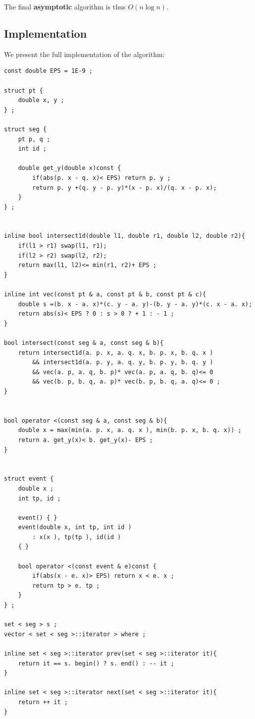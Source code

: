 The final \textbf{asymptotic} algorithm is thus $O (n \log n)$.

\subsection{ Implementation }

We present the full implementation of the algorithm:

\begin{verbatim}
const double EPS = 1E-9 ;
 
struct pt {
    double x, y ;
} ;
 
struct seg {
    pt p, q ;
    int id ;
 
    double get_y(double x)const {
        if(abs(p. x - q. x)< EPS) return p. y ;
        return p. y +(q. y - p. y)*(x - p. x)/(q. x - p. x);
    }
} ;
 
 
inline bool intersect1d(double l1, double r1, double l2, double r2){
    if(l1 > r1) swap(l1, r1);
    if(l2 > r2) swap(l2, r2);
    return max(l1, l2)<= min(r1, r2)+ EPS ;
}
 
inline int vec(const pt & a, const pt & b, const pt & c){
    double s =(b. x - a. x)*(c. y - a. y)-(b. y - a. y)*(c. x - a. x);
    return abs(s)< EPS ? 0 : s > 0 ? + 1 : - 1 ;
}
 
bool intersect(const seg & a, const seg & b){
    return intersect1d(a. p. x, a. q. x, b. p. x, b. q. x )
        && intersect1d(a. p. y, a. q. y, b. p. y, b. q. y )
        && vec(a. p, a. q, b. p)* vec(a. p, a. q, b. q)<= 0
        && vec(b. p, b. q, a. p)* vec(b. p, b. q, a. q)<= 0 ;
}
 
 
bool operator <(const seg & a, const seg & b){
    double x = max(min(a. p. x, a. q. x ), min(b. p. x, b. q. x)) ;
    return a. get_y(x)< b. get_y(x)- EPS ;
}
 
 
struct event {
    double x ;
    int tp, id ;
 
    event() { }
    event(double x, int tp, int id )
        : x(x ), tp(tp ), id(id )
    { }
 
    bool operator <(const event & e)const {
        if(abs(x - e. x)> EPS) return x < e. x ;
        return tp > e. tp ;
    }
} ;
 
set < seg > s ;
vector < set < seg >::iterator > where ;
 
inline set < seg >::iterator prev(set < seg >::iterator it){
    return it == s. begin() ? s. end() : -- it ;
}
 
inline set < seg >::iterator next(set < seg >::iterator it){
    return ++ it ;
}
 

\end{verbatim}
